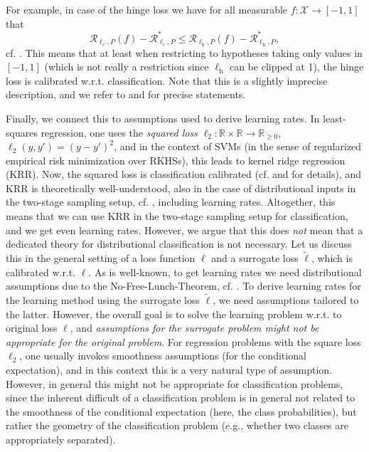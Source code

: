 \documentclass[letterpaper]{article} %
\newcommand{\R}{\mathbb{R}}
\newcommand{\Rnn}{\R_{\geq 0}}
\newcommand{\inputSet}{\mathcal{X}} %
\newcommand{\risk}{\mathcal{R}} %
\newcommand{\Risk}[2]{\risk_{{#1},{#2}}} %
\newcommand{\RiskBayes}[2]{\risk_{{#1},{#2}}^\ast} %
\newcommand{\defm}[1]{\emph{#1}}
\newcommand{\ellClass}{\ell_{\mathrm{c}}} %
\newcommand{\ellHinge}{\ell_{\mathrm{h}}} %
\begin{document}
For example, in case of the hinge loss we have for all measurable $f:\inputSet\rightarrow[-1,1]$ that
\begin{equation*}
    \Risk{\ellClass}{P}(f)-\RiskBayes{\ellClass}{P} \leq \Risk{\ellHinge}{P}(f) - \RiskBayes{\ellHinge}{P},
\end{equation*}
cf. \cite[Theorem~2.31]{SC08}.
This means that at least when restricting to hypotheses taking only values in $[-1,1]$ (which is not really a restriction since $\ellHinge$ can be clipped at 1),
the hinge loss is calibrated w.r.t. classification.
Note that this is a slightly imprecise description, and we refer to \cite[Chapters~3]{SC08} and \cite[Chapter~4]{bach2024learning} for precise statements.

Finally, we connect this to assumptions used to derive learning rates.
In least-squares regression, one uses the \defm{squared loss} $\ell_2: \R\times\R\rightarrow\Rnn$, $\ell_2(y,y')=(y-y')^2$,
and in the context of SVMs (in the sense of regularized empirical risk minimization over RKHSs), this leads to kernel ridge regression (KRR).
Now, the squared loss is classification calibrated (cf. \cite[Section~3.4]{SC08} and \cite[Section~4.1]{bach2024learning} for details),
and KRR is theoretically well-understood, also in the case of distributional inputs in the two-stage sampling setup, cf. \cite{szabo2016learning,fang2020optimal},
including learning rates.
Altogether, this means that we can use KRR in the two-stage sampling setup for classification, and we get even learning rates.
However, we argue that this does \emph{not} mean that a dedicated theory for distributional classification is not necessary.
Let us discuss this in the general setting of a loss function $\ell$ and a surrogate loss $\tilde\ell$, which is calibrated w.r.t. $\ell$.
As is well-known, to get learning rates we need distributional assumptions due to the No-Free-Lunch-Theorem, cf. \cite[Chapter~6]{SC08}.
To derive learning rates for the learning method using the surrogate loss $\tilde\ell$, we need assumptions tailored to the latter.
However, the overall goal is to solve the learning problem w.r.t. to original loss $\ell$, and \emph{assumptions for the surrogate problem might not be appropriate for the original problem}.
For regression problems with the square loss $\ell_2$, one usually invokes smoothness assumptions (for the conditional expectation), and in this context this is a very natural type of assumption.
However, in general this might not be appropriate for classification problems, since the inherent difficult of a classification problem is in general not related to the smoothness of the conditional expectation (here, the class probabilities), but rather the geometry of the classification problem (e.g., whether two classes are appropriately separated).
\end{document}
